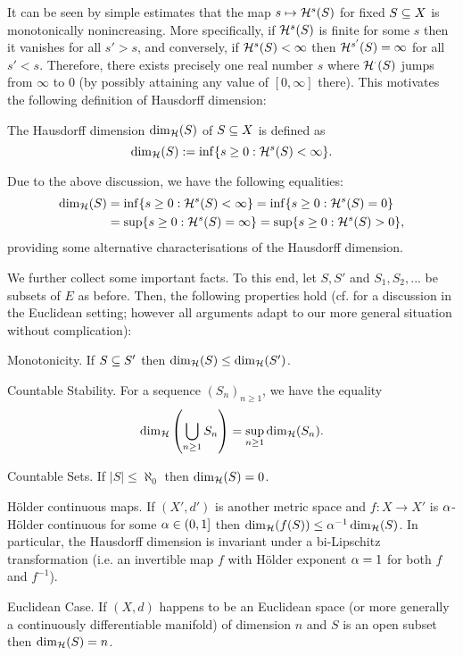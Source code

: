 It can be seen by simple estimates that the map $s\mapsto \mathcal{H}^s(S)$ for fixed $S\subseteq X$ is monotonically nonincreasing. More specifically, if $\mathcal{H}^s(S)$ is finite for some $s$ then it vanishes for all $s'>s$, and conversely, if $\mathcal{H}^s(S)<\infty$ then $\mathcal{H}^{s'}(S)=\infty$ for all $s'<s$. Therefore, there exists precisely one real number $s$ where $\mathcal{H}^\cdot(S)$ jumps from $\infty$ to $0$ (by possibly attaining any value of $[0,\infty]$ there). This motivates the following definition of Hausdorff dimension:
\begin{defin}
  The Hausdorff dimension $\dim_{\mathcal{H}}(S)$ of $S\subseteq X$ is defined as
  \[
    \dim_{\mathcal{H}}(S):=\inf\{s\geq0:\mathcal{H}^s(S)<\infty\}.
  \]
\end{defin}
Due to the above discussion, we have the following equalities:
\begin{align*}
   \dim_{\mathcal{H}}(S)&=\inf\{s\geq0:\mathcal{H}^s(S)<\infty\}=\inf\{s\geq0:\mathcal{H}^s(S)=0\}\\
           &=\sup\{s\geq0:\mathcal{H}^s(S)=\infty\}=\sup\{s\geq0:\mathcal{H}^s(S)>0\},
\end{align*}
providing some alternative characterisations of the Hausdorff dimension.

We further collect some important facts. To this end, let $S,S'$ and $S_1,S_2,...$ be subsets of $E$ as before. Then, the following properties hold (cf. \cite[p.32f]{falconer2007fractal} for a discussion in the Euclidean setting; however all arguments adapt to our more general situation without complication):
\begin{compactdesc}
  \item[Monotonicity.] If $S\subseteq S'$ then $\dim_{\mathcal{H}}(S)\leq\dim_{\mathcal{H}}(S')$. 
  \item[Countable Stability.] For a sequence $(S_n)_{n\geq1}$, we have the equality
  \[ 
    \dim_{\mathcal{H}}\left(\bigcup_{n\geq1}S_n\right)=\sup_{n\geq1} \dim_{\mathcal{H}}(S_n).
  \]
  \item[Countable Sets.] If $|S|\leq\aleph_0$ then $\dim_{\mathcal{H}}(S)=0$.
  \item[H\"older continuous maps.] If $(X',d')$ is another metric space and $f:X\to X'$ is $\alpha$-H\"older continuous for some $\alpha\in(0,1]$ then $\dim_{\mathcal{H}}(f(S))\leq \alpha^{-1}\dim_{\mathcal{H}}(S)$. In particular, the Hausdorff dimension is invariant under a bi-Lipschitz transformation (i.e. an invertible map $f$ with H\"older exponent $\alpha=1$ for both $f$ and $f^{-1}$).
  \item[Euclidean Case.] If $(X,d)$ happens to be an Euclidean space (or more generally a continuously differentiable manifold) of dimension $n$ and $S$ is an open subset then $\dim_{\mathcal{H}}(S)=n$.
\end{compactdesc}

